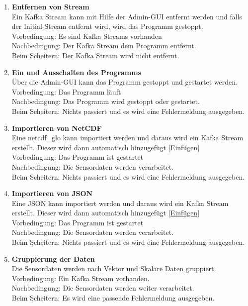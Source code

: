 \begin{enumerate}[label=\textbf{PF\arabic{enumi}0}]
	\item \textbf{Entfernen von Stream}\\
		Ein Kafka Stream kann mit Hilfe der Admin-GUI entfernt werden und falls der Initial-Stream entfernt wird, wird das Programm gestoppt.\\ 
		Vorbedingung: Es sind Kafka Streams vorhanden\\ 
		Nachbedingung: Der Kafka Stream dem Programm entfernt.\\ 
		Beim Scheitern: Der Kafka Stream wird nicht entfernt.
		
	\item \textbf{Ein und Ausschalten des Programms}\\
		Über die Admin-GUI kann das Programm gestoppt und gestartet werden.\\
		Vorbedingung: Das Programm läuft\\  
		Nachbedingung: Das Programm wird gestoppt oder gestartet.\\ 
		Beim Scheitern: Nichts passiert und es wird eine Fehlermeldung ausgegeben.
		
	\item \textbf{Importieren von NetCDF}\\
		Eine \Gls{netcdf_glo} kann importiert werden und daraus wird ein Kafka Stream erstellt. Dieser wird dann automatisch hinzugefügt \ref{Einfügen}\\ 
		Vorbedingung: Das Programm ist gestartet\\ 
		Nachbedingung: Die Sensordaten werden verarbeitet. \\ 
		Beim Scheitern: Nichts passiert und es wird eine Fehlermeldung ausgegeben. 
		
	\item \textbf{Importieren von JSON}\\
		Eine JSON kann importiert werden und daraus wird ein Kafka Stream erstellt. Dieser wird dann automatisch hinzugefügt \ref{Einfügen}\\ 
		Vorbedingung: Das Programm ist gestartet\\ 
		Nachbedingung: Die Sensordaten werden verarbeitet. \\ 
		Beim Scheitern: Nichts passiert und es wird eine Fehlermeldung ausgegeben. 	
		
	\item \textbf{Gruppierung der Daten } \label{Group}\\ 
		Die Sensordaten werden nach Vektor und Skalare Daten gruppiert.\\ 
		Vorbedingung: Ein Kafka Stream vorhanden.\\ 
		Nachbedingung: Die Sensordaten werden weiter verarbeitet. \\ 
		Beim Scheitern: Es wird eine passende Fehlermeldung ausgegeben.	
		

\end{enumerate}

